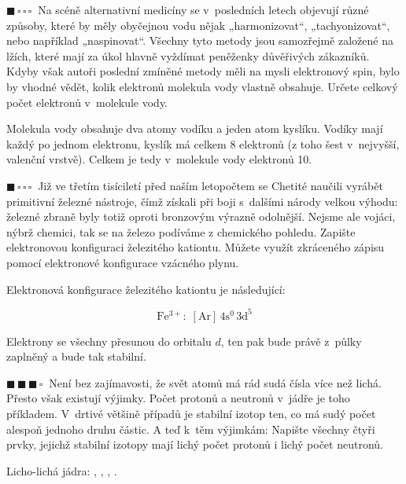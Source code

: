 \documentclass{book}
\newcommand{\jeden}{$\blacksquare \, \square \, \square \, \square \; \; $}
\newcommand{\tri}{$\blacksquare \, \blacksquare \, \blacksquare \, \square \; \; $}
\renewenvironment{quotation}{\par}{\par} %
\begin{document}
\newpage%

\begin{quotation}
\jeden Na scéně alternativní medicíny se v~posledních letech objevují různé
způsoby, které by měly obyčejnou vodu nějak „harmonizovat“, „tachyonizovat“,
nebo například „naspinovat“. Všechny tyto metody jsou samozřejmě založené
na lžích, které mají za úkol hlavně vyždímat peněženky důvěřivých
zákazníků. Kdyby však autoři poslední zmíněné metody měli na mysli
elektronový spin, bylo by vhodné vědět, kolik elektronů molekula vody
vlastně obsahuje. Určete celkový počet elektronů v~molekule vody. 
\end{quotation} \dotfill \par 
Molekula vody obsahuje dva atomy vodíku a jeden atom kyslíku. Vodíky
mají každý po jednom elektronu, kyslík má celkem 8 elektronů (z toho
šest v~nejvyšší, valenční vrstvě). Celkem je tedy v~molekule vody
elektronů 10.

\hrulefill %
\begin{quotation}
\jeden Již ve třetím tisíciletí před naším letopočtem se Chetité naučili
vyrábět primitivní železné nástroje, čímž získali při boji s~dalšími
národy velkou výhodu: železné zbraně byly totiž oproti bronzovým výrazně
odolnější. Nejsme ale vojáci, nýbrž chemici, tak se na železo podíváme
z chemického pohledu. Zapište elektronovou konfiguraci železitého
kationtu. Můžete využít zkráceného zápisu pomocí elektronové konfigurace
vzácného plynu. 
\end{quotation} \dotfill \par 
Elektronová konfigurace železitého kationtu je následující:

\noindent \begin{center}
\[
\mathrm{Fe^{3+}:\;[Ar]\,4s^{0}\,3d^{5}}
\]
\par\end{center}

Elektrony se všechny přesunou do orbitalu $d$, ten pak bude právě z\ půlky
zaplněný a bude tak stabilní.

\hrulefill %
\begin{quotation}
\tri Není bez zajímavosti, že svět atomů má rád sudá čísla více než lichá.
Přesto však existují výjimky. Počet protonů a neutronů v~jádře je
toho příkladem. V~drtivé většině případů je stabilní izotop ten, co
má sudý počet alespoň jednoho druhu částic. A teď k~těm výjimkám:
Napište všechny čtyři prvky, jejichž stabilní izotopy mají lichý počet
protonů i lichý počet neutronů.
\end{quotation} \dotfill \par 
Licho-lichá jádra: , , , .
\end{document}
